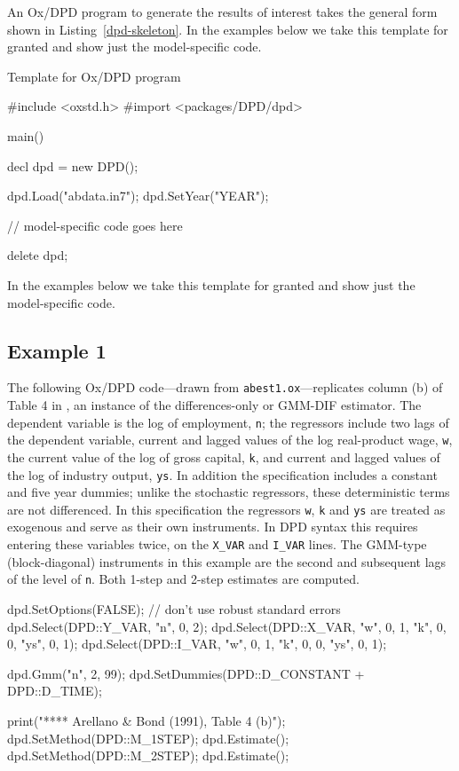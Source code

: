 An Ox/DPD program to generate the results of interest takes the
general form shown in Listing~\ref{dpd-skeleton}. In the examples
below we take this template for granted and show just the
model-specific code.

\begin{script}
  \caption{Template for Ox/DPD program}
  \label{dpd-skeleton}
\begin{scode}
#include <oxstd.h>
#import <packages/DPD/dpd>

main()
{
    decl dpd = new DPD();

    dpd.Load("abdata.in7");
    dpd.SetYear("YEAR");

    // model-specific code goes here

    delete dpd;
}
\end{scode}
\end{script}

In the examples below we take this template for granted and show just
the model-specific code.

\subsection{Example 1}

The following Ox/DPD code---drawn from \texttt{abest1.ox}---replicates
column (b) of Table 4 in \cite{arellano-bond91}, an instance of the
differences-only or GMM-DIF estimator. The dependent variable is the
log of employment, \texttt{n}; the regressors include two lags of the
dependent variable, current and lagged values of the log real-product
wage, \texttt{w}, the current value of the log of gross capital,
\texttt{k}, and current and lagged values of the log of industry
output, \texttt{ys}. In addition the specification includes a constant
and five year dummies; unlike the stochastic regressors, these
deterministic terms are not differenced. In this specification the
regressors \texttt{w}, \texttt{k} and \texttt{ys} are treated as
exogenous and serve as their own instruments. In DPD syntax this
requires entering these variables twice, on the \verb|X_VAR| and
\verb|I_VAR| lines. The GMM-type (block-diagonal) instruments in this
example are the second and subsequent lags of the level of \texttt{n}.
Both 1-step and 2-step estimates are computed.

\begin{code}
dpd.SetOptions(FALSE); // don't use robust standard errors
dpd.Select(DPD::Y_VAR, {"n", 0, 2});
dpd.Select(DPD::X_VAR, {"w", 0, 1, "k", 0, 0, "ys", 0, 1});
dpd.Select(DPD::I_VAR, {"w", 0, 1, "k", 0, 0, "ys", 0, 1});

dpd.Gmm("n", 2, 99);
dpd.SetDummies(DPD::D_CONSTANT + DPD::D_TIME);

print("\n\n***** Arellano & Bond (1991), Table 4 (b)");
dpd.SetMethod(DPD::M_1STEP);
dpd.Estimate();
dpd.SetMethod(DPD::M_2STEP);
dpd.Estimate();
\end{code}

